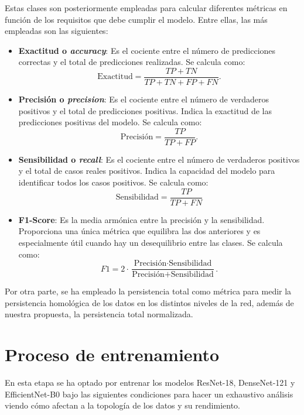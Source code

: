 Estas clases son posteriormente empleadas para calcular diferentes métricas en
función de los requisitos que debe cumplir el modelo. Entre ellas, las más
empleadas son las siguientes:

\begin{itemize}
	\item \textbf{Exactitud o \textit{accuracy}}: Es el cociente entre el número de
	predicciones correctas y el total de predicciones realizadas. Se calcula
	como:
	\[
	\text{Exactitud}= \frac{TP + TN}{TP + TN + FP + FN}.
	\]
	
	\item \textbf{Precisión o \textit{precision}}: Es el cociente entre el número de
	verdaderos positivos y el total de predicciones positivas. Indica la
	exactitud de las predicciones positivas del modelo. Se calcula como:
	\[
	\text{Precisión}= \frac{TP}{TP + FP}.
	\]
	
	\item \textbf{Sensibilidad o \textit{recall}}: Es el cociente entre el número de
	verdaderos positivos y el total de casos reales positivos. Indica la
	capacidad del modelo para identificar todos los casos positivos. Se calcula como:
	\[
	\text{Sensibilidad}= \frac{TP}{TP + FN}
	\]
	
	\item \textbf{F1-Score}: Es la media armónica entre la precisión y la sensibilidad.
	Proporciona una única métrica que equilibra las dos anteriores y es
	especialmente útil cuando hay un desequilibrio entre las clases. Se calcula como:
	\[
	F1 = 2 \cdot \frac{\text{Precisión} \cdot \text{Sensibilidad}}{\text{Precisión}
		+ \text{Sensibilidad}}.
	\]
\end{itemize}

Por otra parte, se ha empleado la persistencia total como métrica para medir la
persistencia homológica de los datos en los distintos niveles de la red, además de
nuestra propuesta, la persistencia total normalizada.

\section{Proceso de entrenamiento}
\label{sec:train}

En esta etapa se ha optado por entrenar los modelos ResNet-18, DenseNet-121 y
EfficientNet-B0 bajo las siguientes condiciones para hacer un exhaustivo
análisis viendo cómo afectan a la topología de los datos y su rendimiento.

